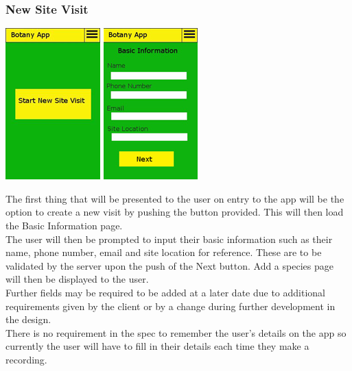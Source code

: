 \documentclass[11pt, titlepage]{article}
\begin{document}
			\subsubsection{New Site Visit}
			\begin{center}
			\includegraphics[scale=1]{res/botanyAppNewSiteVisit1.png}
			 \includegraphics[scale=1]{res/botanyAppNewSiteVisit2.png}
			\end{center}
			
			The first thing that will be presented to the user on entry to the app will be the option to create a new visit by pushing the button provided. This will then load the Basic Information page.\\

			The user will then be prompted to input their basic information such as their name, phone number, email and site location for reference. These are to be validated by the server upon the push of the Next button. 					Add a species page will then be displayed to the user.\\
			
			Further fields may be required to be added at a later date due to additional requirements given by the client or by a change during further 																						development in the design.\\
			
			There is no requirement in the spec to remember the user’s details on the app so currently the user will have to fill in their details each time 																					they make a recording.\\
				
\end{document}
